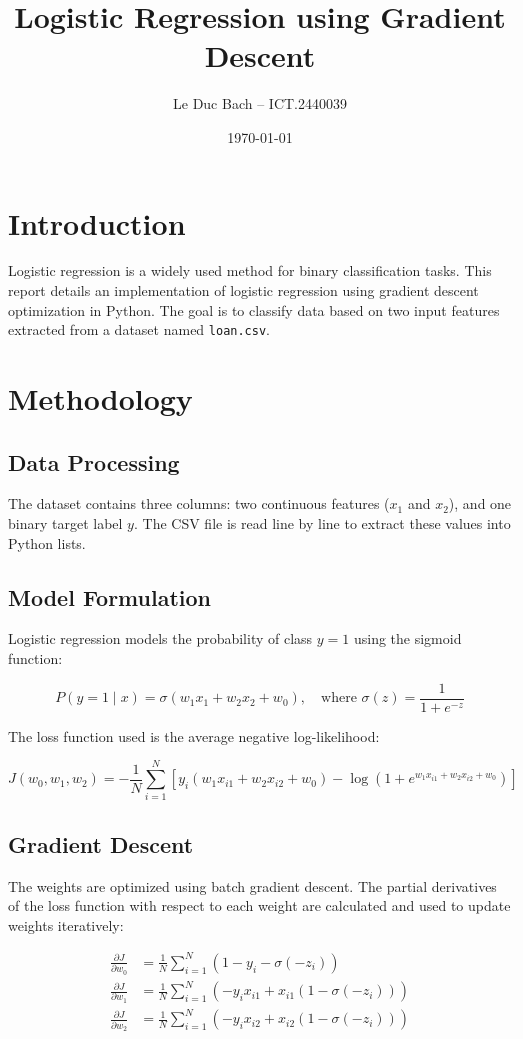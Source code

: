 \documentclass[a4paper, 12pt]{article}
\title{Logistic Regression using Gradient Descent}
\author{Le Duc Bach -- ICT.2440039}
\date{\today}
\begin{document}
\maketitle

\section{Introduction}
Logistic regression is a widely used method for binary classification tasks. This report details an implementation of logistic regression using gradient descent optimization in Python. The goal is to classify data based on two input features extracted from a dataset named \texttt{loan.csv}.

\section{Methodology}

\subsection{Data Processing}
The dataset contains three columns: two continuous features ($x_1$ and $x_2$), and one binary target label $y$. The CSV file is read line by line to extract these values into Python lists.

\subsection{Model Formulation}
Logistic regression models the probability of class $y = 1$ using the sigmoid function:

\[
P(y=1 \mid x) = \sigma(w_1 x_1 + w_2 x_2 + w_0), \quad \text{where } \sigma(z) = \frac{1}{1 + e^{-z}}
\]

The loss function used is the average negative log-likelihood:

\[
J(w_0, w_1, w_2) = -\frac{1}{N} \sum_{i=1}^N \left[ y_i (w_1 x_{i1} + w_2 x_{i2} + w_0) - \log(1 + e^{w_1 x_{i1} + w_2 x_{i2} + w_0}) \right]
\]

\subsection{Gradient Descent}
The weights are optimized using batch gradient descent. The partial derivatives of the loss function with respect to each weight are calculated and used to update weights iteratively:

\begin{align*}
\frac{\partial J}{\partial w_0} &= \frac{1}{N} \sum_{i=1}^N \left(1 - y_i - \sigma(-z_i)\right) \\
\frac{\partial J}{\partial w_1} &= \frac{1}{N} \sum_{i=1}^N \left( -y_i x_{i1} + x_{i1}(1 - \sigma(-z_i)) \right) \\
\frac{\partial J}{\partial w_2} &= \frac{1}{N} \sum_{i=1}^N \left( -y_i x_{i2} + x_{i2}(1 - \sigma(-z_i)) \right)
\end{align*}
\end{document}

